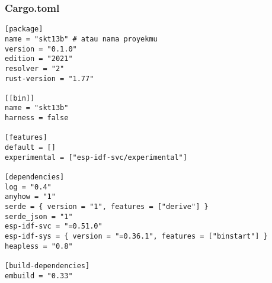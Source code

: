\documentclass[a4paper, 12pt]{article}
\begin{document}
\subsubsection{Cargo.toml}
\begin{lstlisting}[style=tomlstyle, caption={Cargo.toml}]
[package]
name = "skt13b" # atau nama proyekmu
version = "0.1.0"
edition = "2021"
resolver = "2"
rust-version = "1.77"

[[bin]]
name = "skt13b"
harness = false

[features]
default = []
experimental = ["esp-idf-svc/experimental"]

[dependencies]
log = "0.4"
anyhow = "1"
serde = { version = "1", features = ["derive"] }
serde_json = "1"
esp-idf-svc = "=0.51.0"
esp-idf-sys = { version = "=0.36.1", features = ["binstart"] }
heapless = "0.8"

[build-dependencies]
embuild = "0.33"
\end{lstlisting}
\end{document}
